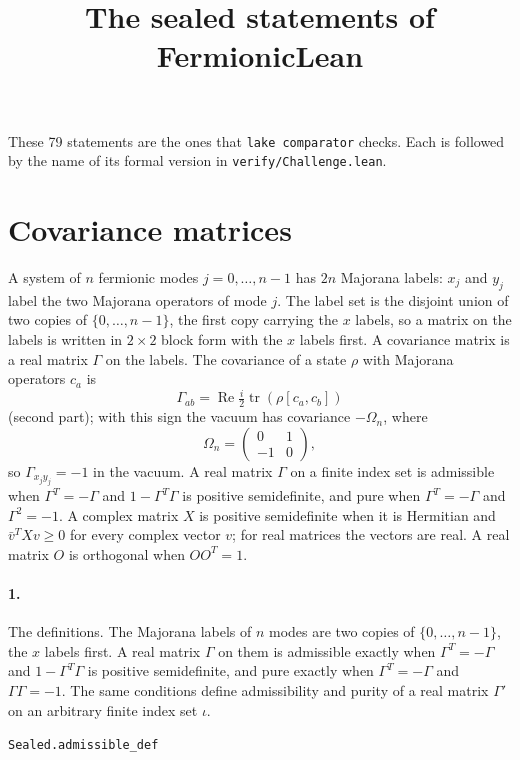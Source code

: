 \documentclass[11pt]{article}
\title{The sealed statements of FermionicLean}\date{}
\begin{document}
\maketitle
These 79 statements are the ones that \texttt{lake comparator} checks. Each is followed by the name of its formal version in \texttt{verify/Challenge.lean}.

\section*{Covariance matrices}
A system of $n$ fermionic modes $j = 0, \dots, n - 1$ has $2n$ Majorana labels: $x_j$ and $y_j$ label the two Majorana operators of mode $j$. The label set is the disjoint union of two copies of $\{0, \dots, n - 1\}$, the first copy carrying the $x$ labels, so a matrix on the labels is written in $2 \times 2$ block form with the $x$ labels first. A covariance matrix is a real matrix $\Gamma$ on the labels. The covariance of a state $\rho$ with Majorana operators $c_a$ is \[\Gamma_{ab} = \operatorname{Re} \tfrac{i}{2} \operatorname{tr}(\rho [c_a, c_b])\] (second part); with this sign the vacuum has covariance $-\Omega_n$, where \[\Omega_n = \begin{pmatrix} 0 & 1 \\ -1 & 0 \end{pmatrix},\] so $\Gamma_{x_j y_j} = -1$ in the vacuum. A real matrix $\Gamma$ on a finite index set is admissible when $\Gamma^T = -\Gamma$ and $1 - \Gamma^T \Gamma$ is positive semidefinite, and pure when $\Gamma^T = -\Gamma$ and $\Gamma^2 = -1$. A complex matrix $X$ is positive semidefinite when it is Hermitian and $\bar v^T X v \ge 0$ for every complex vector $v$; for real matrices the vectors are real. A real matrix $O$ is orthogonal when $O O^T = 1$.

\paragraph{1.} The definitions. The Majorana labels of $n$ modes are two copies of $\{0, \dots, n - 1\}$, the $x$ labels first. A real matrix $\Gamma$ on them is admissible exactly when $\Gamma^T = -\Gamma$ and $1 - \Gamma^T \Gamma$ is positive semidefinite, and pure exactly when $\Gamma^T = -\Gamma$ and $\Gamma \Gamma = -1$. The same conditions define admissibility and purity of a real matrix $\Gamma'$ on an arbitrary finite index set $\iota$.\par{\footnotesize\texttt{Sealed.admissible\_def}}
\end{document}
